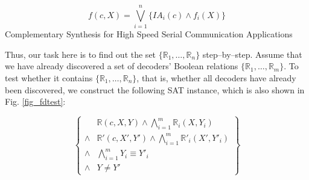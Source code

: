 \documentclass[journal]{IEEEtran}
\begin{document}
\begin{equation}\label{equ_fdfrewagain}
f(c,X)=\bigvee _{i=1}^{n} \{IA_i(c)\wedge f_i(X)\}
\end{equation}
Complementary Synthesis for High Speed Serial Communication Applications
%


Thus,
our task here is to find out the set $\{\mathbb{R}_1,\dots,\mathbb{R}_n\}$ step--by--step.
Assume that we have already discovered a set of decoders' Boolean relations $\{\mathbb{R}_1,\dots,\mathbb{R}_{m}\}$.
To test whether it contains $\{\mathbb{R}_1,\dots,\mathbb{R}_n\}$,
that is,
whether all decoders have already been discovered,
we construct the following SAT instance,
which is also shown in Fig. \ref{fig_fdtest}:



\begin{equation}\label{equ_fdtest}
\left\{
\begin{array}{cc}
      & \mathbb{R}(c,X,Y)\wedge \bigwedge_{i=1}^{m}\mathbb{R}_i(X,Y_i)  \\
\wedge& \mathbb{R}'(c,X',Y') \wedge \bigwedge_{i=1}^{m}\mathbb{R}'_i(X',Y'_i)  \\
\wedge&\bigwedge_{i=1}^{m}Y_i\equiv Y'_i\\
\wedge& Y\ne Y'
\end{array}
\right\}
\end{equation}
\end{document}
